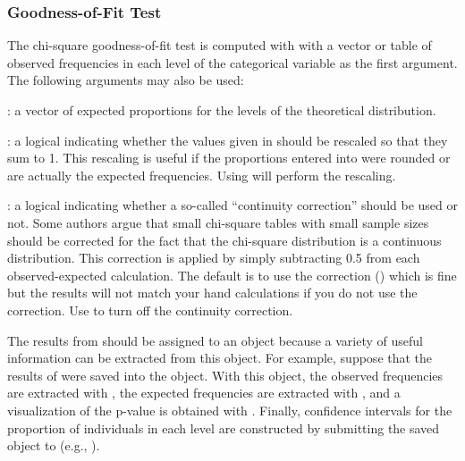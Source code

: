 \documentclass[10pt,openany]{book}\usepackage[]{graphicx}\usepackage[]{color}
\begin{document}

\subsubsection{Goodness-of-Fit Test}
The chi-square goodness-of-fit test is computed with  with a vector or table of observed frequencies in each level of the categorical variable as the first argument.  The following arguments may also be used:
\begin{Itemize}
  \item {}: a vector of expected proportions for the levels of the theoretical distribution.
  \item {}: a logical indicating whether the values given in  should be rescaled so that they sum to 1.  This rescaling is useful if the proportions entered into  were rounded or are actually the expected frequencies.  Using  will perform the rescaling.
  \item {}: a logical indicating whether a so-called ``continuity correction'' should be used or not.  Some authors argue that small chi-square tables with small sample sizes should be corrected for the fact that the chi-square distribution is a continuous distribution.  This correction is applied by simply subtracting 0.5 from each observed-expected calculation.  The default is to use the correction () which is fine but the results will not match your hand calculations if you do not use the correction.  Use  to turn off the continuity correction.
\end{Itemize}


\vspace{-12pt}

The results from  should be assigned to an object because a variety of useful information can be extracted from this object.  For example, suppose that the results of  were saved into the  object.  With this object, the observed frequencies are extracted with , the expected frequencies are extracted with , and a visualization of the p-value is obtained with .  Finally, confidence intervals for the proportion of individuals in each level are constructed by submitting the saved object to  (e.g., ).
\end{document}
